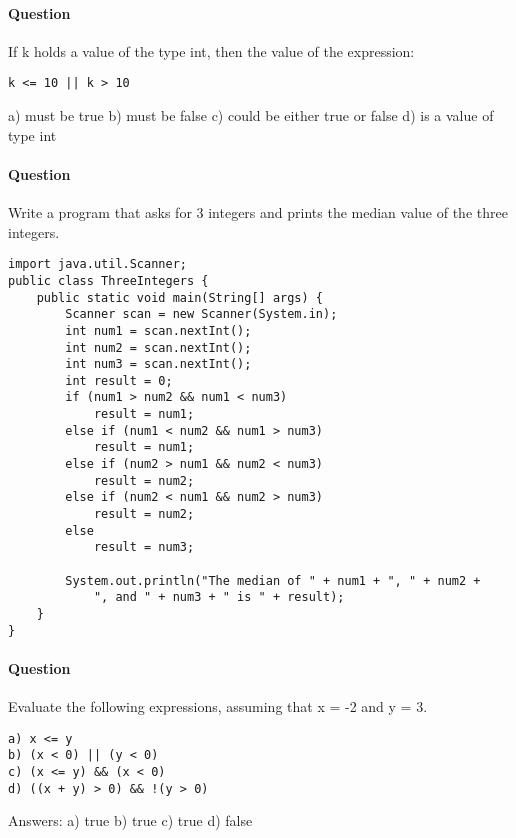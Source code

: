 \documentclass{article}
\begin{document}
\addtocounter{question_num}{1}
\paragraph{Question }
If k holds a value of the type int, then the value of the expression:
\begin{lstlisting}
k <= 10 || k > 10
\end{lstlisting}
a) must be true
\newline b) must be false
\newline c) could be either true or false
\newline d) is a value of type int

\addtocounter{question_num}{1}
\paragraph{Question }
Write a program that asks for 3 integers and prints the median value of the three integers.
\begin{lstlisting}
import java.util.Scanner;
public class ThreeIntegers {
	public static void main(String[] args) {
		Scanner scan = new Scanner(System.in);
		int num1 = scan.nextInt();
		int num2 = scan.nextInt();
		int num3 = scan.nextInt();
		int result = 0;
		if (num1 > num2 && num1 < num3)
			result = num1;
		else if (num1 < num2 && num1 > num3)
			result = num1;
		else if (num2 > num1 && num2 < num3)
			result = num2;
		else if (num2 < num1 && num2 > num3)
			result = num2;
		else
			result = num3;

		System.out.println("The median of " + num1 + ", " + num2 + 
			", and " + num3 + " is " + result);
	}
}
\end{lstlisting}

\addtocounter{question_num}{1}
\paragraph{Question }
Evaluate the following expressions, assuming that x = -2 and y = 3.
\begin{lstlisting} 
a) x <= y 
b) (x < 0) || (y < 0)
c) (x <= y) && (x < 0)
d) ((x + y) > 0) && !(y > 0)
\end{lstlisting}
{\color{red}Answers:
\newline a) true
\newline b) true
\newline c) true
\newline d) false}
\end{document}
